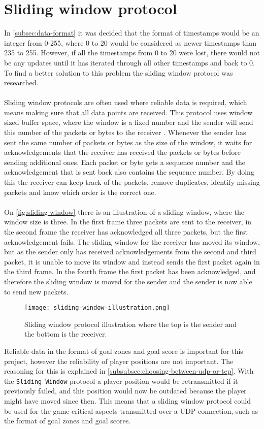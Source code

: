 \section{Sliding window protocol}\label{sec:sliding-window}
In \autoref{subsec:data-format} it was decided that the format of timestamps would be an integer from 0-255, where 0 to 20 would be considered as newer timestamps than 235 to 255.
However, if all the timestamps from 0 to 20 were lost, there would not be any updates until it has iterated through all other timestamps and back to 0.
To find a better solution to this problem the sliding window protocol was researched.
\\\\
Sliding window protocols are often used where reliable data is required, which means making sure that all data points are received.
This protocol uses window sized buffer space, where the window is a fixed number and the sender will send this number of the packets or bytes to the receiver \cite{design-and-validation-of-computer-protocols}.
Whenever the sender has sent the same number of packets or bytes as the size of the window, it waits for acknowledgements that the receiver has received the packets or bytes before sending additional ones.
Each packet or byte gets a sequence number and the acknowledgement that is sent back also contains the sequence number.
By doing this the receiver can keep track of the packets, remove duplicates, identify missing packets and know which order is the correct one.
\\\\
On \autoref{fig:sliding-window} there is an illustration of a sliding window, where the window size is three.
In the first frame three packets are sent to the receiver, in the second frame the receiver has acknowledged all three packets, but the first acknowledgement fails.
The sliding window for the receiver has moved its window, but as the sender only has received acknowledgements from the second and third packet, it is unable to move its window and instead sends the first packet again in the third frame.
In the fourth frame the first packet has been acknowledged, and therefore the sliding window is moved for the sender and the sender is now able to send new packets.
\begin{figure}[H]
    \centering
    \texttt{[image: sliding-window-illustration.png]}
    \caption{Sliding window protocol illustration where the top is the sender and the bottom is the receiver.}
    \label{fig:sliding-window}
\end{figure}
\noindent
Reliable data in the format of goal zones and goal score is important for this project, however the reliability of player positions are not important.
The reasoning for this is explained in \autoref{subsubsec:choosing-between-udp-or-tcp}.
With the \texttt{Sliding Window} protocol a player position would be retransmitted if it previously failed, and this position would now be outdated because the player might have moved since then.
This means that a sliding window protocol could be used for the game critical aspects transmitted over a UDP connection, such as the format of goal zones and goal scores.




